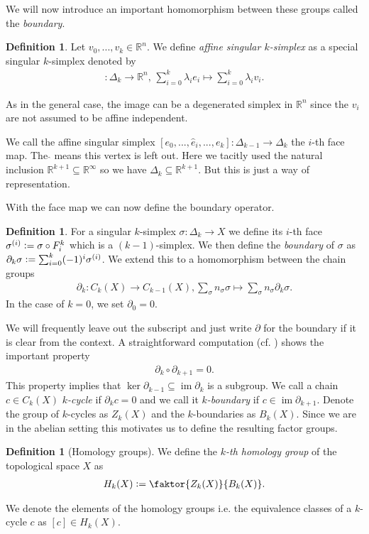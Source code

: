\documentclass[12pt,a4paper]{article}
\numberwithin{equation}{subsection}
\numberwithin{lemma}{subsection}
\theoremstyle{definition}
\newtheorem{definition}[lemma]{Definition}
\DeclareMathOperator{\Ima}{im}
\newcommand{\real}{\mathbb{R}}
\begin{document}
We will now introduce an important homomorphism between these groups called the \textit{boundary}.
\begin{definition}
    Let $v_0, ... , v_k \in \real^n$. 
    We define \textit{affine singular $k$-simplex} as a special singular $k$-simplex denoted by
    \begin{align*}
        [v_0,...,v_k]: \Delta_k \rightarrow \real^n, \, 
        \sum\limits_{i = 0}^k \lambda_i e_i \mapsto \sum\limits_{i = 0}^k \lambda_i v_i.
    \end{align*}
\end{definition}
As in the general case, the image can be a degenerated simplex in $\real^n$ since the 
$v_i$ are not assumed to be affine independent. 

We call the affine singular simplex 
$[e_0,...,\hat{e}_i,...,e_k]: \Delta_{k-1} \rightarrow \Delta_k$ the $i$-th face map. 
The $\hat{ }$ means this vertex is left out. Here we tacitly used the 
natural inclusion $\real^{k+1} \subseteq \real^\infty$ so we have 
$\Delta_k \subseteq \real^{k+1}$. But this is just a way of representation.

With the face map we can now define the boundary operator.
\begin{definition}
    For a singular $k$-simplex $\sigma: \Delta_k \rightarrow X$ we define its $i$-th face 
    $\sigma^{(i)} \vcentcolon= \sigma \circ F_i^k$ which is a $(k-1)$-simplex. 
    We then define the \textit{boundary} of $\sigma$ as 
    $\partial_k \sigma \vcentcolon= \sum_{i=0}^k (-1)^i \sigma^{(i)}$. We extend this 
    to a homomorphism between the chain groups
    \begin{align*}
        \partial_k: C_k(X) \rightarrow C_{k-1}(X), 
        \sum_\sigma n_\sigma \sigma \mapsto \sum_\sigma n_\sigma \partial_k \sigma.
    \end{align*}
    In the case of $k=0$, we set $\partial_0 = 0$.
\end{definition}
We will frequently leave out the subscript and just write $\partial$ for the boundary 
if it is clear from the context.
A straightforward computation (cf. \cite[Lemma 1.6]{topology_and_geometry}) shows the 
important property 
\begin{align*}
    \partial_k \circ \partial_{k+1} = 0.
\end{align*}
This property implies that $\ker \partial_{k-1} \subseteq \Ima \partial_k$ is 
a subgroup. We call a chain $c \in C_k(X)$ \textit{$k$-cycle} if $\partial_k c = 0$ and 
we call it \textit{$k$-boundary} if $c \in \Ima \partial_{k+1}$. 
Denote the group of $k$-cycles as $Z_k(X)$ and the $k$-boundaries as $B_k(X)$.
Since we are in the abelian setting this motivates us to define 
the resulting factor groups.
\begin{definition}[Homology groups]
    We define the \textit{$k$-th homology group} of the topological space $X$ as
    \begin{align*}
        H_k(X) \vcentcolon= \faktor{Z_k(X)}{B_k(X)}.
    \end{align*} 
\end{definition}
We denote the elements of the homology groups i.e. the equivalence classes of a 
$k$-cycle $c$ as $[c] \in H_k(X)$.
\end{document}
